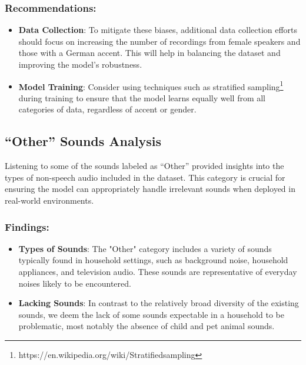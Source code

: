 

\subsubsection{Recommendations:}

\begin{itemize}
    \item \textbf{Data Collection}: To mitigate these biases, additional data collection efforts should focus on increasing the number of recordings from female speakers and those with a German accent. This will help in balancing the dataset and improving the model's robustness.
    \item \textbf{Model Training}: Consider using techniques such as stratified sampling\footnote{https://en.wikipedia.org/wiki/Stratified\textunderscore sampling} during training to ensure that the model learns equally well from all categories of data, regardless of accent or gender.
\end{itemize}

\subsection{``Other'' Sounds Analysis}

Listening to some of the sounds labeled as “Other” provided insights into the types of
non-speech audio included in the dataset.
This category is crucial for ensuring the model can appropriately handle irrelevant sounds
when deployed in real-world environments.

\subsubsection{Findings:}

\begin{itemize}
    \item \textbf{Types of Sounds}:
    The "Other" category includes a variety of sounds typically found in household settings,
    such as background noise, household appliances, and television audio.
    These sounds are representative of everyday noises likely to be encountered.
    \item \textbf{Lacking Sounds}:
    In contrast to the relatively broad diversity of the existing sounds, we deem the lack of
    some sounds expectable in a household to be problematic, most notably the absence of child and pet animal sounds.
\end{itemize}

